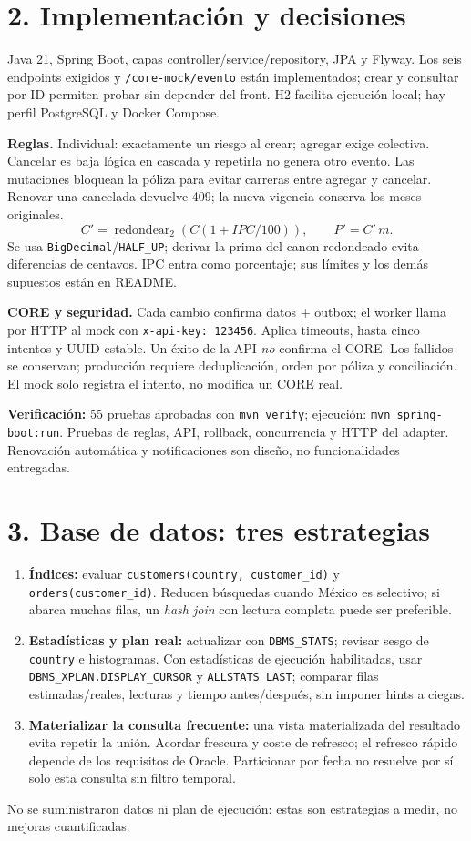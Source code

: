 \documentclass[11pt,a4paper]{article}
\newcommand{\tagline}[1]{\textbf{#1}\enspace}
\begin{document}
\section{2. Implementación y decisiones}
Java 21, Spring Boot, capas controller/service/repository, JPA y Flyway. Los seis endpoints exigidos y \texttt{/core-mock/evento} están implementados; crear y consultar por ID permiten probar sin depender del front. H2 facilita ejecución local; hay perfil PostgreSQL y Docker Compose.

\tagline{Reglas.} Individual: exactamente un riesgo al crear; agregar exige colectiva. Cancelar es baja lógica en cascada y repetirla no genera otro evento. Las mutaciones bloquean la póliza para evitar carreras entre agregar y cancelar. Renovar una cancelada devuelve 409; la nueva vigencia conserva los meses originales.
\[
 C'=\operatorname{redondear}_{2}\!\left(C(1+IPC/100)\right),\qquad P'=C'\,m.
\]
Se usa \texttt{BigDecimal}/\texttt{HALF\_UP}; derivar la prima del canon redondeado evita diferencias de centavos. IPC entra como porcentaje; sus límites y los demás supuestos están en README.

\tagline{CORE y seguridad.} Cada cambio confirma datos + outbox; el worker llama por HTTP al mock con \texttt{x-api-key: 123456}. Aplica timeouts, hasta cinco intentos y UUID estable. Un éxito de la API \emph{no} confirma el CORE. Los fallidos se conservan; producción requiere deduplicación, orden por póliza y conciliación. El mock solo registra el intento, no modifica un CORE real.

{\small\textbf{Verificación:} 55 pruebas aprobadas con \texttt{mvn verify}; ejecución: \texttt{mvn spring-boot:run}. Pruebas de reglas, API, rollback, concurrencia y HTTP del adapter. Renovación automática y notificaciones son diseño, no funcionalidades entregadas.}

\newpage
\section{3. Base de datos: tres estrategias}
\begin{enumerate}
\item \textbf{Índices:} evaluar \texttt{customers(country, customer\_id)} y \texttt{orders(customer\_id)}. Reducen búsquedas cuando México es selectivo; si abarca muchas filas, un \emph{hash join} con lectura completa puede ser preferible.
\item \textbf{Estadísticas y plan real:} actualizar con \texttt{DBMS\_STATS}; revisar sesgo de \texttt{country} e histogramas. Con estadísticas de ejecución habilitadas, usar \texttt{DBMS\_XPLAN.DISPLAY\_CURSOR} y \texttt{ALLSTATS LAST}; comparar filas estimadas/reales, lecturas y tiempo antes/después, sin imponer hints a ciegas.
\item \textbf{Materializar la consulta frecuente:} una vista materializada del resultado evita repetir la unión. Acordar frescura y coste de refresco; el refresco rápido depende de los requisitos de Oracle. Particionar por fecha no resuelve por sí solo esta consulta sin filtro temporal.
\end{enumerate}
No se suministraron datos ni plan de ejecución: estas son estrategias a medir, no mejoras cuantificadas.
\end{document}

